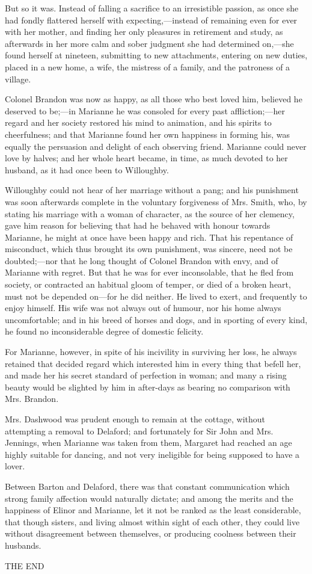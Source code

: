 But so it was. Instead of falling a sacrifice to an irresistible passion, as once she had fondly flattered herself with expecting,---instead of remaining even for ever with her mother, and finding her only pleasures in retirement and study, as afterwards in her more calm and sober judgment she had determined on,---she found herself at nineteen, submitting to new attachments, entering on new duties, placed in a new home, a wife, the mistress of a family, and the patroness of a village.

Colonel Brandon was now as happy, as all those who best loved him, believed he deserved to be;---in Marianne he was consoled for every past affliction;---her regard and her society restored his mind to animation, and his spirits to cheerfulness; and that Marianne found her own happiness in forming his, was equally the persuasion and delight of each observing friend. Marianne could never love by halves; and her whole heart became, in time, as much devoted to her husband, as it had once been to Willoughby.

Willoughby could not hear of her marriage without a pang; and his punishment was soon afterwards complete in the voluntary forgiveness of Mrs. Smith, who, by stating his marriage with a woman of character, as the source of her clemency, gave him reason for believing that had he behaved with honour towards Marianne, he might at once have been happy and rich. That his repentance of misconduct, which thus brought its own punishment, was sincere, need not be doubted;---nor that he long thought of Colonel Brandon with envy, and of Marianne with regret. But that he was for ever inconsolable, that he fled from society, or contracted an habitual gloom of temper, or died of a broken heart, must not be depended on---for he did neither. He lived to exert, and frequently to enjoy himself. His wife was not always out of humour, nor his home always uncomfortable; and in his breed of horses and dogs, and in sporting of every kind, he found no inconsiderable degree of domestic felicity.

For Marianne, however, in spite of his incivility in surviving her loss, he always retained that decided regard which interested him in every thing that befell her, and made her his secret standard of perfection in woman; and many a rising beauty would be slighted by him in after-days as bearing no comparison with Mrs. Brandon.

Mrs. Dashwood was prudent enough to remain at the cottage, without attempting a removal to Delaford; and fortunately for Sir John and Mrs. Jennings, when Marianne was taken from them, Margaret had reached an age highly suitable for dancing, and not very ineligible for being supposed to have a lover.

Between Barton and Delaford, there was that constant communication which strong family affection would naturally dictate; and among the merits and the happiness of Elinor and Marianne, let it not be ranked as the least considerable, that though sisters, and living almost within sight of each other, they could live without disagreement between themselves, or producing coolness between their husbands.

THE END

